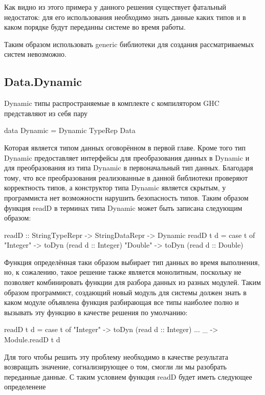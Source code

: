\documentclass[a4paper,12pt]{article}
\newenvironment{code}{\footnotesize\verbatim}{\endverbatim\normalsize}
\begin{document}
Как видно из этого примера у данного решения существует фатальный
недостаток: для его использования необходимо знать данные каких типов
и в каком порядке будут переданны системе во время работы.

Таким образом использовать generic библиотеки для создания
рассматриваемых систем невозможно.

\subsection{Data.Dynamic}

Dynamic типы распространяемые в комплекте с компилятором GHC
представляют из себя пару

\begin{code}
  data Dynamic = Dynamic TypeRep Data
\end{code}

Которая является типом данных оговорённом в первой главе. Кроме того
тип Dynamic предоставляет интерфейсы для преобразования данных в
Dynamic и для преобразования из типа Dynamic в первоначальный тип
данных. Благодаря тому, что все преобразования реализованные в данной
библиотеки проверяют корректность типов, а конструктор типа Dynamic
является скрытым, у программиста нет возможности нарушить безопасность
типов. Таким образом функция readD в терминах типа Dynamic может быть
записана следующим образом:

\begin{code}
  readD :: StringTypeRepr -> StringDataRepr -> Dynamic
  readD t d = case t of
                "Integer" -> toDyn (read d :: Integer)
                "Double"  -> toDyn (read d :: Double)
\end{code}

Функция определённая таки образом выбирает тип данных во время
выполнения, но, к сожалению, такое решение также является монолитным,
поскольку не позволяет комбинировать функции для разбора данных из
разных модулей. Таким образом программист, создающий новый модуль для
системы должен знать в каком модуле объявлена функция разбирающая все
типы наиболее полно и вызывать эту функцию в качестве решения по
умолчанию:

\begin{code}
  readD t d = case t of
                "Integer" -> toDyn (read d :: Integer)
                ...
                _  -> Module.readD t d
\end{code}

Для того чтобы решить эту проблему необходимо в качестве результата
возвращать значение, согнализирующее о том, смогли ли мы разобрать
переданные данные. С таким условием функция readD будет иметь
следующее определенеие
\end{document}
